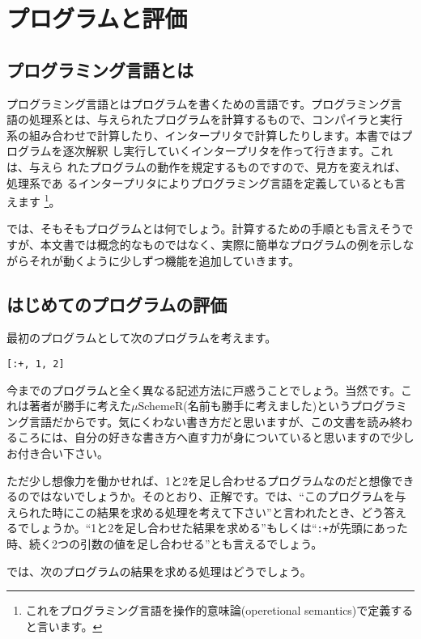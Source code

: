 \chapter{プログラムと評価\hspace{-3mm}}

\section{プログラミング言語とは}

プログラミング言語とはプログラムを書くための言語です。プログラミング言
語の処理系とは、与えられたプログラムを計算するもので、コンパイラと実行
系の組み合わせで計算したり、インタープリタで計算したりします。本書ではプログラムを逐次解釈
し実行していくインタープリタを作って行きます。これは、与えら
れたプログラムの動作を規定するものですので、見方を変えれば、処理系であ
るインタープリタによりプログラミング言語を定義しているとも言えます
\footnote{これをプログラミング言語を操作的意味論(operetional semantics)で定義すると言います。}。

では、そもそもプログラムとは何でしょう。計算するための手順とも言えそうですが、本文書では概念的なものではなく、実際に簡単なプログラムの例を示しながらそれが動くように少しずつ機能を追加していきます。

\section{はじめてのプログラムの評価}

最初のプログラムとして次のプログラムを考えます。

\begin{lstlisting}
[:+, 1, 2]
\end{lstlisting}

今までのプログラムと全く異なる記述方法に戸惑うことでしょう。当然です。これは著者が勝手に考えた$\mu$SchemeR(名前も勝手に考えました)というプログラミング言語だからです。気にくわない書き方だと思いますが、この文書を読み終わるころには、自分の好きな書き方へ直す力が身についていると思いますので少しお付き合い下さい。

ただ少し想像力を働かせれば、1と2を足し合わせるプログラムなのだと想像できるのではないでしょうか。そのとおり、正解です。では、“このプログラムを与えられた時にこの結果を求める処理を考えて下さい”と言われたとき、どう答えるでしょうか。“1と2を足し合わせた結果を求める”もしくは“{\tt :+}が先頭にあった時、続く2つの引数の値を足し合わせる”とも言えるでしょう。

では、次のプログラムの結果を求める処理はどうでしょう。

